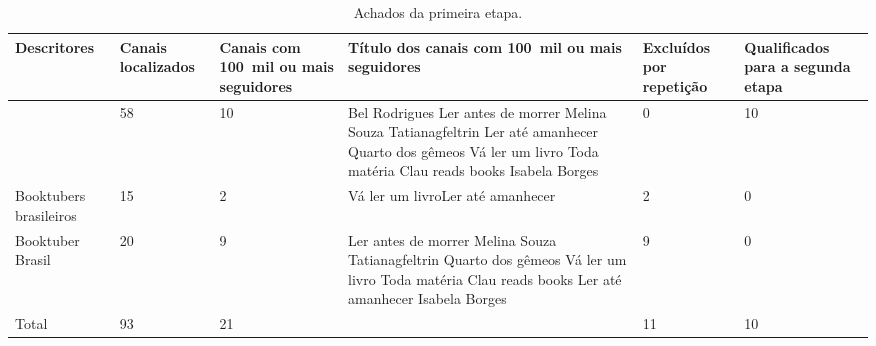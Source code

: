 \documentclass[portuguese]{textolivre}
\begin{document}
\begin{table}[htpb]
\centering
\small
\begin{threeparttable}
\caption{Achados da primeira etapa.}
\label{tbl01}
\begin{tabular}{lllp{3cm}ll}
\toprule
\multicolumn{1}{p{1.8cm}}{Descritores} & 
\multicolumn{1}{p{1.8cm}}{Canais localizados} &
\multicolumn{1}{p{1.8cm}}{Canais com 100~mil ou mais seguidores} &
Título dos canais com 100~mil ou mais seguidores &
\multicolumn{1}{p{1.8cm}}{Excluídos por repetição} &
\multicolumn{1}{p{1.8cm}}{Qualificados para a segunda etapa} \\
\midrule
\arrayrulecolor[gray]{.7}
\multicolumn{1}{p{1.8cm}}{Booktubers Brasil} & 58 & 10 & 
Bel Rodrigues\newline
Ler antes de morrer\newline
Melina Souza\newline
Tatianagfeltrin\newline
Ler até amanhecer\newline
Quarto dos gêmeos\newline
Vá ler um livro\newline
Toda matéria\newline
Clau reads books\newline
Isabela Borges & 0 & 10 \\
\midrule
\multicolumn{1}{p{1.8cm}}{Booktubers brasileiros} & 15 & 2 & Vá ler um livro\newline Ler até amanhecer & 2 & 0 \\
\midrule
\multicolumn{1}{p{1.8cm}}{Booktuber Brasil} & 20 & 9 & Ler antes de morrer\newline
Melina Souza\newline
Tatianagfeltrin\newline
Quarto dos gêmeos\newline
Vá ler um livro\newline
Toda matéria\newline
Clau reads books\newline
Ler até amanhecer\newline
Isabela Borges & 9 & 0 \\
\arrayrulecolor{black}
\midrule
Total & 93 & 21 & & 11 & 10 \\
\bottomrule
\end{tabular}
\end{threeparttable}
\end{table}
\end{document}
